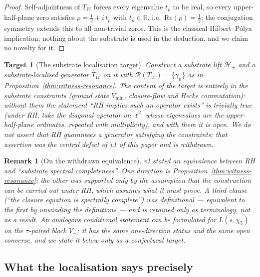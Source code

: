 \documentclass[11pt,a4paper]{article}
\newtheorem{target}[theorem]{Target}
\newtheorem{remark}[theorem]{Remark}
\newcommand{\R}{\mathbb{R}}
\newcommand{\Vmin}{V_{\min}}
\newcommand{\Twit}{T_W}
\begin{document}
\begin{proof}
Self-adjointness of $\Twit$ forces every eigenvalue $t_\rho$ to
be real, so every upper-half-plane zero satisfies
$\rho = \tfrac12 + i\,t_\rho$ with $t_\rho \in \R$, i.e.\
$\mathrm{Re}(\rho) = \tfrac12$; the conjugation symmetry extends
this to all non-trivial zeros. This is the classical
Hilbert--P\'olya implication; nothing about the substrate is used
in the deduction, and we claim no novelty for it.
\end{proof}

\begin{target}[The substrate localisation target]
\label{target:main}
Construct a substrate lift $\mathcal{H}_+$ and a
substrate-localised generator $\Twit$ on it with
$\mathcal{R}(\Twit) = \{\gamma_n\}$ as in
Proposition~\ref{thm:witness-resonance}. The content of the target
is entirely in the substrate constraints (ground state $\Vmin$,
closure-flow and Hecke commutation): without them the statement
``RH implies such an operator exists'' is trivially true (under RH,
take the diagonal operator on $\ell^2$ whose eigenvalues are the
upper-half-plane ordinates, repeated with multiplicity), and
with them it is open. We do not assert that RH guarantees a
generator satisfying the constraints; that assertion was the
central defect of v1 of this paper and is withdrawn.
\end{target}

\begin{remark}[On the withdrawn equivalence]
v1 stated an equivalence between RH and ``substrate spectral
completeness''. One direction is
Proposition~\ref{thm:witness-resonance}; the other was supported
only by the assumption that the construction can be carried out
under RH, which assumes what it must prove. A third clause
(``the closure equation is spectrally complete'') was definitional
--- equivalent to the first by unwinding the definitions --- and is
retained only as terminology, not as a result. An analogous
conditional statement can be formulated for $L(s,\chi_5)$ on the
$\tau$-paired block $V_-$; it has the same one-direction status
and the same open converse, and we state it below only as a
conjectural target.
\end{remark}

\subsection{What the localisation says precisely}
\end{document}
